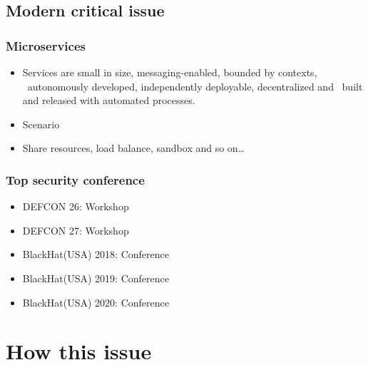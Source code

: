 \documentclass{beamer}
\begin{document}
\subsection{Modern critical issue}
\begin{frame}
    \frametitle{Microservices}
    \begin{itemize}
        \item Services are small in size, messaging-enabled, bounded by contexts, \
              autonomously developed, independently deployable, decentralized and \
              built and released with automated processes.\cite{Microservice_book}
        \item Scenario
        \item Share resources, load balance, sandbox and so on\dots
    \end{itemize}
\end{frame}

\begin{frame}
    \frametitle{Top security conference}
    \begin{itemize}
        \item DEFCON 26: Workshop\cite{DEFCON26_workshop}
        \item DEFCON 27: Workshop\cite{DEFCON27_workshop}
        \item BlackHat(USA) 2018: Conference\cite{BlackHat2018}
        \item BlackHat(USA) 2019: Conference\cite{BlackHat2019}
        \item BlackHat(USA) 2020: Conference\cite{BlackHat2020}
    \end{itemize}
\end{frame}



\section{How this issue}
\end{document}
